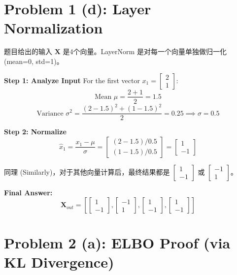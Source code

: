 \documentclass[12pt]{article}
\begin{document}
\section*{Problem 1 (d): Layer Normalization}

题目给出的输入 $\mathbf{X}$ 是4个向量。LayerNorm 是对每一个向量单独做归一化 (mean=0, std=1)。

\vspace{0.5cm} %

\textbf{Step 1: Analyze Input}
For the first vector $x_1 = \begin{bmatrix} 2 \\ 1 \end{bmatrix}$:
\[
    \text{Mean } \mu = \frac{2+1}{2} = 1.5
\]
\[
    \text{Variance } \sigma^2 = \frac{(2-1.5)^2 + (1-1.5)^2}{2} = 0.25 \implies \sigma = 0.5
\]

\textbf{Step 2: Normalize}
\[
    \hat{x}_1 = \frac{x_1 - \mu}{\sigma} = \begin{bmatrix} (2-1.5)/0.5 \\ (1-1.5)/0.5 \end{bmatrix} = \begin{bmatrix} 1 \\ -1 \end{bmatrix}
\]

同理 (Similarly)，对于其他向量计算后，最终结果都是 $\begin{bmatrix} 1 \\ -1 \end{bmatrix}$ 或 $\begin{bmatrix} -1 \\ 1 \end{bmatrix}$。

\textbf{Final Answer:}
\[
    \mathbf{X}_{out} = \left[ 
    \begin{bmatrix} 1 \\ -1 \end{bmatrix}, 
    \begin{bmatrix} -1 \\ 1 \end{bmatrix}, 
    \begin{bmatrix} 1 \\ -1 \end{bmatrix}, 
    \begin{bmatrix} 1 \\ -1 \end{bmatrix} 
    \right]
\]


\section*{Problem 2 (a): ELBO Proof (via KL Divergence)}
\end{document}
